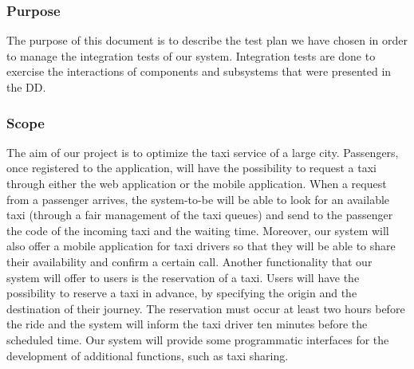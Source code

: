 \subsubsection{Purpose}
The purpose of this document is to describe the test plan we have chosen in order to manage the integration tests of our system. Integration tests are done to exercise the interactions of components and subsystems that were presented in the DD. 

\subsubsection{Scope}
The aim of our project is to optimize the taxi service of a large city. 
Passengers, once registered to the application, will have the possibility to request a taxi through either the web application or the mobile application. When a request from a passenger arrives, the system-to-be will be able to look for an available taxi (through a fair management of the taxi queues) and send to the passenger the code of the incoming taxi and the waiting time. 
\newline
Moreover, our system will also offer a mobile application for taxi drivers so that they will be able to share their availability and confirm a certain call.
\newline
Another functionality that our system will offer to users is the reservation of a taxi. Users will have the possibility to reserve a taxi in advance, by specifying the origin and the destination of their journey. The reservation must occur at least two hours before the ride and the system will inform the taxi driver ten minutes before the scheduled time.
\newline
Our system will provide some programmatic interfaces for the development of additional functions, such as taxi sharing.